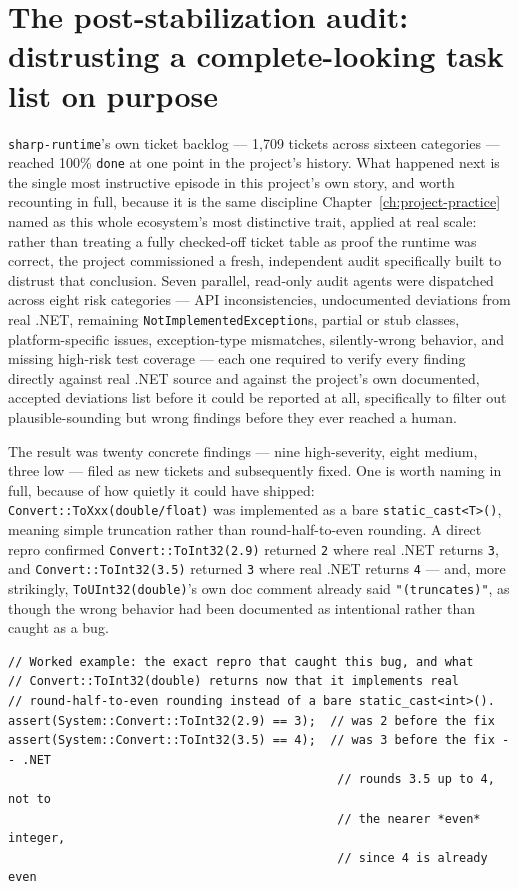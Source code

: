 \section{The post-stabilization audit: distrusting a complete-looking task list on purpose}

\texttt{sharp-runtime}'s own ticket backlog --- 1{,}709 tickets across sixteen categories ---
reached 100\% \texttt{done} at one point in the project's history. What happened next is the
single most instructive episode in this project's own story, and worth recounting in full,
because it is the same discipline Chapter~\ref{ch:project-practice} named as this whole
ecosystem's most distinctive trait, applied at real scale: rather than treating a fully
checked-off ticket table as proof the runtime was correct, the project commissioned a fresh,
independent audit specifically built to distrust that conclusion. Seven parallel, read-only
audit agents were dispatched across eight risk categories --- API inconsistencies,
undocumented deviations from real .NET, remaining \texttt{NotImplementedException}s, partial
or stub classes, platform-specific issues, exception-type mismatches, silently-wrong
behavior, and missing high-risk test coverage --- each one required to verify every finding
directly against real .NET source and against the project's own documented, accepted
deviations list before it could be reported at all, specifically to filter out
plausible-sounding but wrong findings before they ever reached a human.

The result was twenty concrete findings --- nine high-severity, eight medium, three low ---
filed as new tickets and subsequently fixed. One is worth naming in full, because of how
quietly it could have shipped: \texttt{Convert::ToXxx(double/float)} was implemented as a
bare \texttt{static\_cast<T>()}, meaning simple truncation rather than round-half-to-even
rounding. A direct repro confirmed \texttt{Convert::ToInt32(2.9)} returned \texttt{2} where
real .NET returns \texttt{3}, and \texttt{Convert::ToInt32(3.5)} returned \texttt{3} where real
.NET returns \texttt{4} --- and, more strikingly, \texttt{ToUInt32(double)}'s own doc comment
already said \texttt{"(truncates)"}, as though the wrong behavior had been documented as
intentional rather than caught as a bug.

\begin{lstlisting}
// Worked example: the exact repro that caught this bug, and what
// Convert::ToInt32(double) returns now that it implements real
// round-half-to-even rounding instead of a bare static_cast<int>().
assert(System::Convert::ToInt32(2.9) == 3);  // was 2 before the fix
assert(System::Convert::ToInt32(3.5) == 4);  // was 3 before the fix -- .NET
                                              // rounds 3.5 up to 4, not to
                                              // the nearer *even* integer,
                                              // since 4 is already even
\end{lstlisting}

